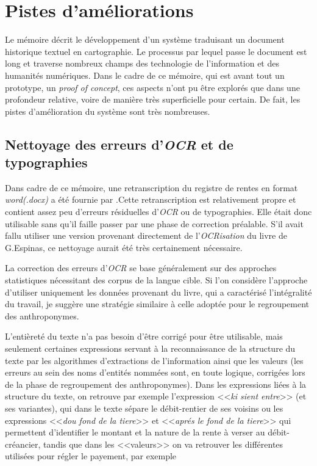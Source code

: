 \section{Pistes d'améliorations}
Le mémoire décrit le développement d'un système traduisant un document historique textuel en cartographie. Le processus par lequel passe le document est long  et traverse nombreux champs des technologie de l'information et des humanités numériques. Dans le cadre de ce  mémoire, qui est avant tout un prototype, un \textit{proof of concept}, ces aspects n'ont pu être explorés que dans une profondeur relative, voire de manière très superficielle pour certain. De fait, les pistes d'amélioration du système sont très nombreuses.

\subsection{Nettoyage des erreurs d'\textit{OCR} et de typographies}
Dans cadre de ce mémoire, une retranscription du registre de rentes en format  \textit{word(.docx)} a été fournie par %
.Cette retranscription est relativement propre et contient assez peu d'erreurs résiduelles d'\textit{OCR} ou de typographies. Elle était donc utilisable sans qu'il faille passer par une phase de correction préalable. S'il avait fallu utiliser une version provenant directement de l'\textit{OCRisation} du livre de G.Espinas, ce nettoyage aurait été très certainement nécessaire. 

La correction des erreurs d'\textit{OCR} se base généralement sur des approches statistiques nécessitant des corpus de la langue cible. Si l'on considère l'approche d'utiliser uniquement les données provenant du livre, qui a caractérisé l'intégralité du travail, je suggère une stratégie similaire à celle adoptée pour le regroupement des anthroponymes.

L'entièreté du texte n'a pas besoin d'être corrigé pour être utilisable, mais seulement certaines expressions servant à la reconnaissance de la structure du texte par les algorithmes d'extractions de l'information ainsi que les valeurs (les erreurs au sein des noms d'entités nommées sont, en toute logique, corrigées lors de la phase de regroupement des anthroponymes). Dans les expressions liées à la structure du texte, on retrouve par exemple l'expression <<\textit{ki sient entre}>> (et ses variantes), qui dans le texte sépare le débit-rentier de ses voisins ou  les expressions <<\textit{dou fond de la tiere}>> et <<\textit{aprés le fond de la tiere}>>  qui permettent d'identifier le montant et la nature de la rente à verser au débit-créancier, tandis que dans les <<valeurs>> on va retrouver les différentes utilisées pour régler le payement, par exemple %

